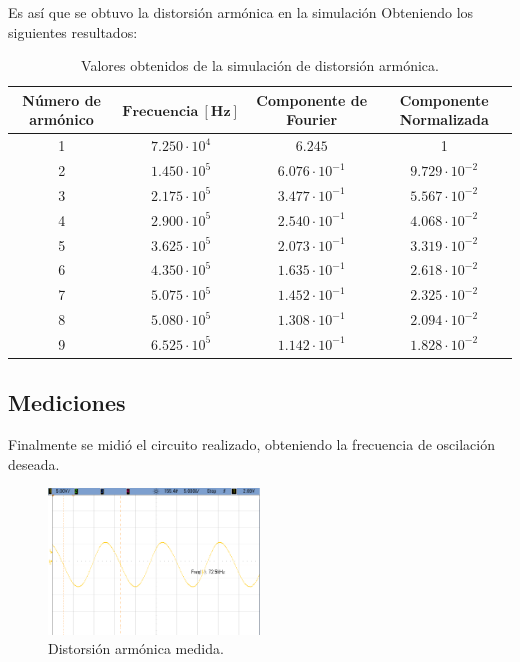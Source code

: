 Es así que se obtuvo la distorsión armónica en la simulación Obteniendo los siguientes resultados:
\begin{table}[H]
\centering
\begin{tabular}{cccc}
\hline
\textbf{Número de armónico} & $\mathbf{Frecuencia \ [Hz]}$ & \textbf{Componente de Fourier} & \textbf{Componente Normalizada} \\
\hline
1 & $7.250 \cdot 10^{4}$ & $6.245$ & 1 \\
2 & $1.450 \cdot 10^{5}$ & $6.076 \cdot 10^{-1}$ & $9.729 \cdot 10^{-2}$ \\
3 & $2.175 \cdot 10^{5}$ & $3.477 \cdot 10^{-1}$ & $5.567 \cdot 10^{-2}$ \\
4 & $2.900 \cdot 10^{5}$ & $2.540\cdot 10^{-1}$ & $4.068 \cdot 10^{-2}$ \\
5 & $3.625 \cdot 10^{5}$ & $2.073 \cdot 10^{-1}$ & $3.319 \cdot 10^{-2}$ \\
6 & $4.350 \cdot 10^{5}$ & $1.635 \cdot 10^{-1}$ & $2.618 \cdot 10^{-2}$ \\
7 & $5.075 \cdot 10^{5}$ & $1.452 \cdot 10^{-1}$ & $2.325 \cdot 10^{-2}$ \\
8 & $5.080 \cdot 10^{5}$ & $1.308 \cdot 10^{-1}$ & $2.094 \cdot 10^{-2}$ \\
9 & $6.525 \cdot 10^{5}$ & $1.142 \cdot 10^{-1}$ & $1.828 \cdot 10^{-2}$ \\
\hline
\end{tabular}
\caption{Valores obtenidos de la simulación de distorsión armónica.}
\label{tab:distSpice}
\end{table}

\subsection{Mediciones}
Finalmente se midió el circuito realizado, obteniendo la frecuencia de oscilación deseada.
\begin{figure}[H]
	\centering
	\includegraphics[width=0.5\textwidth]{Imagenes-Ej1/oscilador.png}
	\caption{Distorsión armónica medida.}
	\label{fig:trans}
\end{figure}


